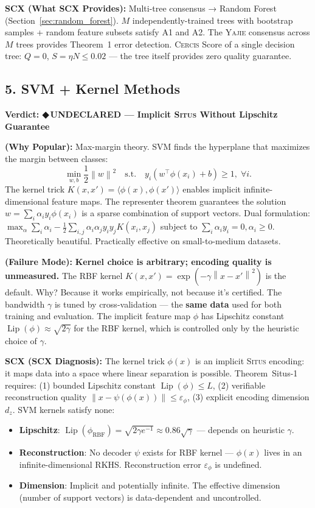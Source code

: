 \documentclass[12pt,a4paper]{article}
\theoremstyle{definition}
\newcommand{\guilty}{{\color{guiltycolor}\textbf{◆\,UNDECLARED}}}
\newcommand{\Situs}{\textsc{Situs}}
\newcommand{\Yajie}{\textsc{Yajie}}
\newcommand{\Cercis}{\textsc{Cercis}}
\DeclareMathOperator{\Lip}{Lip}
\newcommand{\norm}[1]{\left\lVert#1\right\rVert}
\newcommand{\inner}[2]{\langle #1, #2 \rangle}
\newcommand{\auditHeader}[1]{\medskip\noindent\textbf{\large #1}\medskip}
\newcommand{\whyPopular}{\noindent\textbf{ (Why Popular):} }
\newcommand{\whyFail}{\noindent\textbf{ (Failure Mode):} }
\newcommand{\whatMissing}{\noindent\textbf{SCX (What SCX Provides):} }
\newcommand{\diagnosis}{\noindent\textbf{SCX (SCX Diagnosis):} }
\begin{document}
\whatMissing{} Multi-tree consensus → Random Forest (Section~\ref{sec:random_forest}). $M$ independently-trained trees with bootstrap samples + random feature subsets satisfy A1 and A2. The \Yajie{} consensus across $M$ trees provides Theorem~1 error detection. \Cercis{} Score of a single decision tree: $Q=0$, $S=\eta N \le 0.02$ — the tree itself provides zero quality guarantee.

\subsection{5. SVM + Kernel Methods }

\auditHeader{Verdict: \guilty{} — Implicit \Situs{} Without Lipschitz Guarantee}

\whyPopular{} Max-margin theory. SVM finds the hyperplane that maximizes the margin between classes:
\[
\min_{w,b} \frac{1}{2}\norm{w}^2 \quad \text{s.t.} \quad y_i(w^\top \phi(x_i) + b) \ge 1, \; \forall i.
\]
The kernel trick $K(x, x') = \inner{\phi(x)}{\phi(x')}$ enables implicit infinite-dimensional feature maps. The representer theorem guarantees the solution $w = \sum_i \alpha_i y_i \phi(x_i)$ is a sparse combination of support vectors. Dual formulation: $\max_\alpha \sum_i \alpha_i - \frac{1}{2}\sum_{i,j}\alpha_i\alpha_j y_i y_j K(x_i, x_j)$ subject to $\sum_i \alpha_i y_i = 0, \alpha_i \ge 0$. Theoretically beautiful. Practically effective on small-to-medium datasets.

\whyFail{} \textbf{Kernel choice is arbitrary; encoding quality is unmeasured.} The RBF kernel $K(x, x') = \exp(-\gamma\norm{x-x'}^2)$ is the default. Why? Because it works empirically, not because it's certified. The bandwidth $\gamma$ is tuned by cross-validation — the \textbf{same data} used for both training and evaluation. The implicit feature map $\phi$ has Lipschitz constant $\Lip(\phi) \approx \sqrt{2\gamma}$ for the RBF kernel, which is controlled only by the heuristic choice of $\gamma$.

\diagnosis{} The kernel trick $\phi(x)$ is an implicit \Situs{} encoding: it maps data into a space where linear separation is possible. Theorem~Situs-1 requires: (1) bounded Lipschitz constant $\Lip(\phi) \le L$, (2) verifiable reconstruction quality $\norm{x - \psi(\phi(x))} \le \varepsilon_\phi$, (3) explicit encoding dimension $d_z$. SVM kernels satisfy none:
\begin{itemize}[nosep]
    \item \textbf{Lipschitz}: $\Lip(\phi_{\text{RBF}}) = \sqrt{2\gamma e^{-1}} \approx 0.86\sqrt{\gamma}$ — depends on heuristic $\gamma$.
    \item \textbf{Reconstruction}: No decoder $\psi$ exists for RBF kernel — $\phi(x)$ lives in an infinite-dimensional RKHS. Reconstruction error $\varepsilon_\phi$ is undefined.
    \item \textbf{Dimension}: Implicit and potentially infinite. The effective dimension (number of support vectors) is data-dependent and uncontrolled.
\end{itemize}
\end{document}
